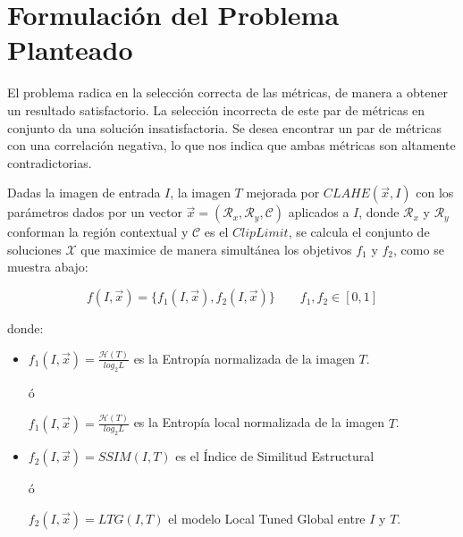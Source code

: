 \documentclass[spanish,twocolumn]{article}
\begin{document}
\section{Formulación del Problema Planteado}
\label{sec:formulacion}
El problema radica en la selección correcta de las métricas, de manera a obtener un resultado satisfactorio. La selección incorrecta de este par de métricas en conjunto da una solución insatisfactoria. Se desea encontrar un par de métricas con una correlación negativa, lo que nos indica que ambas métricas son altamente contradictorias.

Dadas la imagen de entrada $I$, la imagen $T$ mejorada por $CLAHE(\overrightarrow{x},I)$ con los parámetros dados por un vector $\overrightarrow{x}=(\mathcal{R}_x, \mathcal{R}_y, \mathcal{C})$ aplicados a $I$, donde $\mathcal{R}_x$ y $\mathcal{R}_y$ conforman la región contextual y $\mathscr{C}$ es el $Clip Limit$, se calcula el conjunto de soluciones $\mathscr{X}$ que maximice de manera simultánea los objetivos $f_1$ y $f_2$, como se muestra abajo:

\begin{equation}\label{eq:fitness}
    f(I, \overrightarrow{x}) = \{ f_1(I, \overrightarrow{x}), f_2(I, \overrightarrow{x}) \} \qquad f_1,f_2 \in [0,1]
\end{equation}

donde:
\begin{itemize}
\item $f_{1}(I, \overrightarrow{x})=\frac{\mathscr{H}(T)}{log_{2}L}$ es la Entropía normalizada de la imagen $T$.

ó

$f_{1}(I, \overrightarrow{x})=\frac{\mathscr{H}(T)}{log_{2}L}$ es la Entropía local normalizada de la imagen $T$.

\item $f_{2}(I, \overrightarrow{x})=SSIM(I,T)$ es el Índice de Similitud Estructural 

ó

 $f_{2}(I, \overrightarrow{x})=LTG(I,T)$ el modelo Local Tuned Global  entre $I$ y $T$.
\end{itemize}
\end{document}
